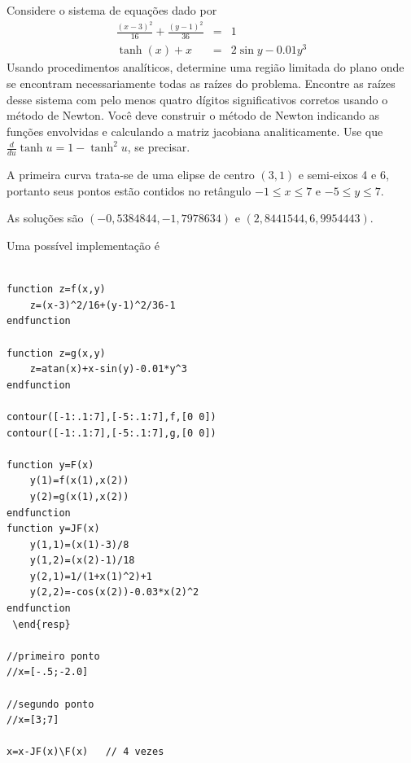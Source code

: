 \begin{exer} Considere o sistema de equações dado por
\begin{eqnarray*}
\frac{(x-3)^2}{16}+\frac{(y-1)^2}{36}&=&1\\
\tanh(x)+x&=&2\sin y-0.01y^3
\end{eqnarray*}
Usando procedimentos analíticos, determine uma região limitada do plano onde se encontram necessariamente todas as raízes do problema.
Encontre as raízes desse sistema com pelo menos quatro dígitos significativos corretos usando o método de Newton. Você deve construir o método de Newton indicando as funções envolvidas e calculando a matriz jacobiana analiticamente. Use que $\frac{d}{du}\tanh u = 1-\tanh^2u$, se precisar.
\end{exer}
\begin{resp}
 A primeira curva trata-se de uma elipse de centro $(3,1)$ e semi-eixos 4 e 6, portanto seus pontos estão contidos no retângulo $-1\leq x \leq 7$ e $-5\leq y \leq 7$.

As soluções são $\left( -0,5384844 , -1,7978634\right)$ e $\left(2,8441544, 6,9954443\right)$.

\ifisscilab
Uma possível implementação é
\begin{verbatim}

function z=f(x,y)
    z=(x-3)^2/16+(y-1)^2/36-1
endfunction

function z=g(x,y)
    z=atan(x)+x-sin(y)-0.01*y^3
endfunction

contour([-1:.1:7],[-5:.1:7],f,[0 0])
contour([-1:.1:7],[-5:.1:7],g,[0 0])

function y=F(x)
    y(1)=f(x(1),x(2))
    y(2)=g(x(1),x(2))
endfunction
function y=JF(x)
    y(1,1)=(x(1)-3)/8
    y(1,2)=(x(2)-1)/18
    y(2,1)=1/(1+x(1)^2)+1
    y(2,2)=-cos(x(2))-0.03*x(2)^2
endfunction
 \end{resp}

//primeiro ponto
//x=[-.5;-2.0]

//segundo ponto
//x=[3;7]

x=x-JF(x)\F(x)   // 4 vezes
\end{verbatim}
\fi
\end{resp}


